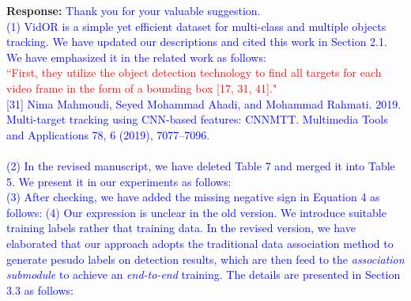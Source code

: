\documentclass[12pt,journal,onecolumn]{IEEEtran}
\begin{document}
\textbf{Response:} \textcolor{blue}{Thank you for your valuable suggestion. \\
(1) VidOR is a simple yet efficient dataset for multi-class and multiple objects tracking.
We have updated our descriptions and cited this work in Section 2.1. 
We have emphasized it in the related work as follows: \\
\textcolor{red}{
``First, they utilize the object detection technology to find all targets for
each video frame in the form of a bounding box [17, 31, 41]." \\
\textcolor{blue}{
[31] Nima Mahmoudi, Seyed Mohammad Ahadi, and Mohammad Rahmati. 2019. Multi-target tracking using CNN-based features: CNNMTT. Multimedia Tools and Applications 78, 6 (2019), 7077–7096.
}
\\ \\
}
(2) In the revised manuscript, we have deleted Table 7 and merged it into Table 5.
We present it in our experiments as follows: \\
(3) After checking, we have added the missing negative sign in Equation 4 as follows: 
(4)  Our expression is unclear in the old version.
We introduce suitable training labels rather that training data.
In the revised version, we have elaborated that our approach adopts the traditional data association method to generate pesudo labels on detection results, which are then feed to the \emph{association submodule} to achieve an \emph{end-to-end} training.
The details are presented in Section 3.3 as follows: \\
}
\end{document}
